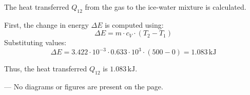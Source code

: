 The heat transferred \( Q_{12} \) from the gas to the ice-water mixture is calculated.  

First, the change in energy \( \Delta E \) is computed using:  
\[
\Delta E = m \cdot c_V \cdot (T_2 - T_1)
\]  
Substituting values:  
\[
\Delta E = 3.422 \cdot 10^{-3} \cdot 0.633 \cdot 10^3 \cdot (500 - 0) = 1.083 \, \text{kJ}
\]  

Thus, the heat transferred \( Q_{12} \) is \( 1.083 \, \text{kJ} \).  

---  
No diagrams or figures are present on the page.